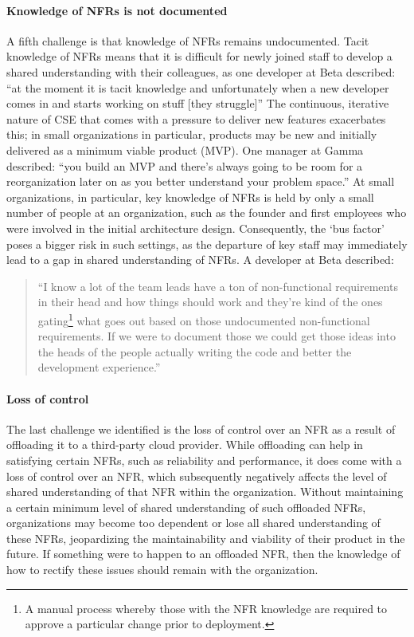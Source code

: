 \documentclass[smallextended]{svjour3}
\begin{document}
\paragraph{Knowledge of NFRs is not documented} A fifth challenge is that knowledge of NFRs remains undocumented. Tacit knowledge of NFRs means that it is difficult for newly joined staff to develop a shared understanding with their colleagues, as one developer at Beta described:
\textmd{``at the moment it is tacit knowledge and unfortunately when a new developer comes in and starts working on stuff [they struggle]''}
The continuous, iterative nature of CSE that comes with a pressure to deliver new features exacerbates this; in small organizations in particular, products may be new and initially delivered as a minimum viable product (MVP). One manager at Gamma described:
\textmd{``you build an MVP and there's always going to be room for a reorganization later on as you better understand your problem space.''}
At small organizations, in particular, key knowledge of NFRs is held by only a small number of people at an organization, such as the founder and first employees who were involved in the initial architecture design. Consequently, the `bus factor' poses a bigger risk in such settings, as the departure of key staff may immediately lead to a gap in shared understanding of NFRs.
A developer at Beta described:
\begin{quote}
    ``I know a lot of the team leads have a ton of non-functional requirements in their head and how things should work and they're kind of the ones gating\footnote{A manual process whereby those with the NFR knowledge are required to approve a particular change prior to deployment.} what goes out based on those undocumented non-functional requirements. If we were to document those we could get those ideas into the heads of the people actually writing the code and better the development experience.''
\end{quote}




\paragraph{Loss of control} The last challenge we identified is the loss of control over an NFR as a result of offloading it to a third-party cloud provider.
While offloading can help in satisfying certain NFRs, such as reliability and performance, it does come with a loss of control over an NFR, which subsequently negatively affects the level of shared understanding of that NFR within the organization. 
Without maintaining a certain minimum level of shared understanding of such offloaded NFRs, organizations may become too dependent or lose all shared understanding of these NFRs, jeopardizing the maintainability and viability of their product in the future. If something were to happen to an offloaded NFR, then the knowledge of how to rectify these issues should remain with the organization.
\end{document}
